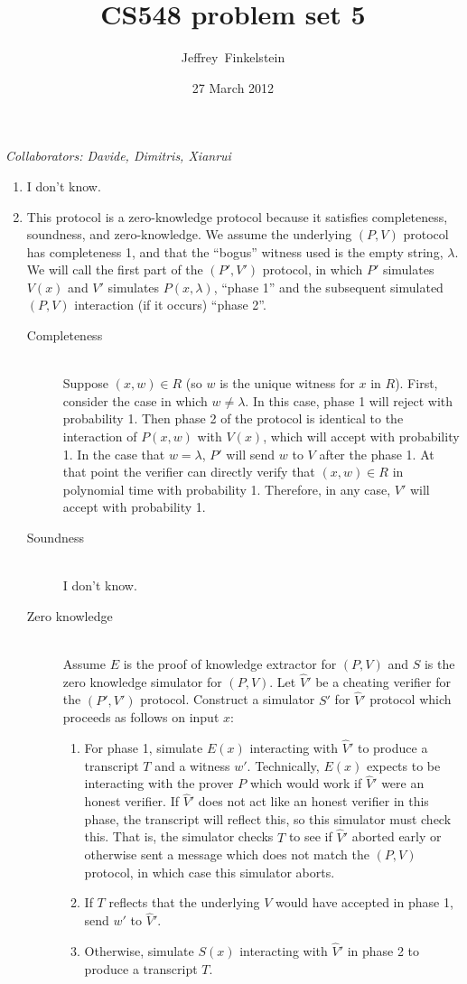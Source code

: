 \documentclass[draft]{article}
\author{Jef{}frey~Finkelstein}
\date{27 March 2012}
\title{CS548 problem set 5}
\newcommand{\collaborators}[1]{\emph{Collaborators: #1}}
\begin{document}
\maketitle
\collaborators{Davide, Dimitris, Xianrui}
\begin{enumerate}
\item I don't know.
\item 
  This protocol is a zero-knowledge protocol because it satisfies completeness, soundness, and zero-knowledge.
  We assume the underlying $(P, V)$ protocol has completeness 1, and that the ``bogus'' witness used is the empty string, $\lambda$.
  We will call the first part of the $(P', V')$ protocol, in which $P'$ simulates $V(x)$ and $V'$ simulates $P(x, \lambda)$, ``phase 1'' and the subsequent simulated $(P, V)$ interaction (if it occurs) ``phase 2''.

  \begin{description}
  \item[Completeness] \hfill \\
    Suppose $(x, w)\in R$ (so $w$ is the unique witness for $x$ in $R$).
    First, consider the case in which $w\neq\lambda$.
    In this case, phase 1 will reject with probability 1.
    Then phase 2 of the protocol is identical to the interaction of $P(x, w)$ with $V(x)$, which will accept with probability 1.
    In the case that $w=\lambda$, $P'$ will send $w$ to $V$ after the phase 1.
    At that point the verifier can directly verify that $(x, w)\in R$ in polynomial time with probability 1.
    Therefore, in any case, $V'$ will accept with probability 1.
  \item[Soundness] \hfill \\
    I don't know.
  \item[Zero knowledge] \hfill \\
    Assume $E$ is the proof of knowledge extractor for $(P, V)$ and $S$ is the zero knowledge simulator for $(P, V)$.
    Let $\hat{V}'$ be a cheating verifier for the $(P', V')$ protocol.
    Construct a simulator $S'$ for $\hat{V}'$ protocol which proceeds as follows on input $x$:
    \begin{enumerate}
    \item
      For phase 1, simulate $E(x)$ interacting with $\hat{V}'$ to produce a transcript $T$ and a witness $w'$.
      Technically, $E(x)$ expects to be interacting with the prover $P$ which would work if $\hat{V}'$ were an honest verifier.
      If $\hat{V}'$ does not act like an honest verifier in this phase, the transcript will reflect this, so this simulator must check this.
      That is, the simulator checks $T$ to see if $\hat{V}'$ aborted early or otherwise sent a message which does not match the $(P, V)$ protocol, in which case this simulator aborts.
    \item If $T$ reflects that the underlying $V$ would have accepted in phase 1, send $w'$ to $\hat{V}'$.
    \item Otherwise, simulate $S(x)$ interacting with $\hat{V}'$ in phase 2 to produce a transcript $T$.
    \end{enumerate}


\end{description}
\end{enumerate}
\end{document}
